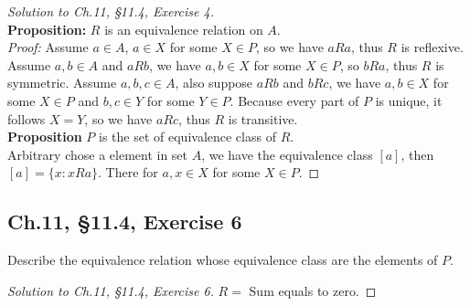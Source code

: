 \documentclass[12pt]{amsart}
\numberwithin{equation}{section}
\theoremstyle{definition}
\theoremstyle{remark}
\begin{document}
\begin{proof}[Solution to Ch.11, \S 11.4,  Exercise 4] \ \\
\textbf{Proposition:} $ R $ is an equivalence relation on $ A $.\\
\textit{Proof:} Assume $ a \in A $, $ a \in X $ for some $ X \in P $, so we have $ aRa $, thus $ R $ is reflexive. Assume $ a, b \in A $ and $ aRb $, we have $ a, b \in X $ for some $ X \in P $, so $ bRa $, thus $ R $ is symmetric. Assume $ a, b, c \in A $, also suppose $ aRb $ and $ bRc $, we have $ a, b \in X $ for some $ X \in P $ and $ b, c \in Y $ for some $ Y \in P $. Because every part of $ P $ is unique, it follows $ X = Y $, so we have $ aRc $, thus $ R $ is transitive.\\
\textbf{Proposition} $ P $ is the set of equivalence class of $ R $.\\
Arbitrary chose a element in set $ A $, we have the equivalence class $ [a] $, then $ [a] = \{x : x R a \} $. There for $ a, x \in X $ for some $ X \in P $.

\end{proof}




\subsection*{Ch.11, \S 11.4,  Exercise 6}  Describe the equivalence relation whose equivalence class are the elements of $ P $.


\begin{proof}[Solution to Ch.11, \S 11.4,  Exercise 6] $ R= $ Sum equals to zero.

\end{proof}




\end{document}
